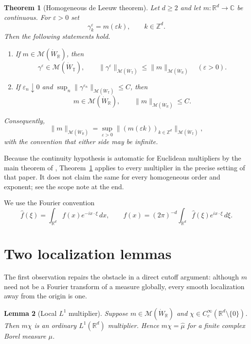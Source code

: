 \documentclass[11pt]{article}
\newtheorem{theorem}{Theorem}
\newtheorem{lemma}[theorem]{Lemma}
\newcommand{\R}{\mathbb R}
\newcommand{\T}{\mathbb T}
\newcommand{\Z}{\mathbb Z}
\newcommand{\M}{\mathcal M}
\newcommand{\eps}{\varepsilon}
\newcommand{\wh}{\widehat}
\begin{document}
\begin{theorem}[Homogeneous de Leeuw theorem]\label{thm:main}
Let $d\ge2$ and let $m:\R^d\to\mathbb C$ be continuous.  For $\eps>0$ set
\[
 \gamma_k^{\eps}=m(\eps k),\qquad k\in\Z^d.
\]
Then the following statements hold.
\begin{enumerate}
\item If $m\in\M(\dot W_{\R})$, then
\[
 \gamma^\eps\in\M(\dot W_{\T}),\qquad
 \|\gamma^\eps\|_{\M(\dot W_{\T})}
 \le \|m\|_{\M(\dot W_{\R})}
 \quad(\eps>0).
\]
\item If $\eps_n\downarrow0$ and
$\sup_n\|\gamma^{\eps_n}\|_{\M(\dot W_{\T})}\le C$, then
\[
 m\in\M(\dot W_{\R}),\qquad
 \|m\|_{\M(\dot W_{\R})}\le C.
\]
\end{enumerate}
Consequently,
\begin{equation}\label{eq:norm-identity}
 \|m\|_{\M(\dot W_{\R})}
 =\sup_{\eps>0}\|(m(\eps k))_{k\in\Z^d}\|_{\M(\dot W_{\T})},
\end{equation}
with the convention that either side may be infinite.
\end{theorem}

Because the continuity hypothesis is automatic for Euclidean multipliers by
the main theorem of \cite{KW}, Theorem~\ref{thm:main} applies to every
multiplier in the precise setting of that paper.  It does not claim the same
for every homogeneous order and exponent; see the scope note at the end.

We use the Fourier convention
\[
 \wh f(\xi)=\int_{\R^d}f(x)e^{-ix\cdot\xi}\,dx,
 \qquad
 f(x)=(2\pi)^{-d}\int_{\R^d}\wh f(\xi)e^{ix\cdot\xi}\,d\xi.
\]

\section{Two localization lemmas}

The first observation repairs the obstacle in a direct cutoff argument:
although $m$ need not be a Fourier transform of a measure globally, every
smooth localization away from the origin is one.

\begin{lemma}[Local $L^1$ multiplier]\label{lem:local-L1}
Suppose $m\in\M(\dot W_{\R})$ and
$\chi\in C_c^\infty(\R^d\setminus\{0\})$.  Then $m\chi$ is an ordinary
$L^1(\R^d)$ multiplier.  Hence $m\chi=\wh\mu$ for a finite complex Borel
measure $\mu$.
\end{lemma}
\end{document}
